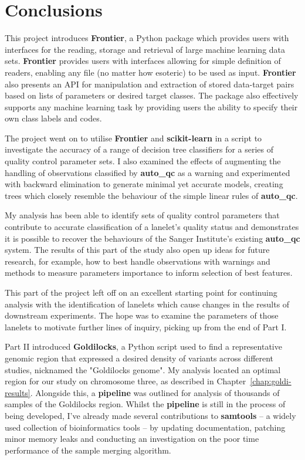 \chapter{Conclusions}

This project introduces \textbf{Frontier}, a Python package which provides users
with interfaces for the reading, storage and retrieval of large machine learning
data sets.  \textbf{Frontier} provides users with interfaces allowing for simple
definition of readers, enabling any file (no matter how esoteric) to be used as
input. \textbf{Frontier} also presents an API for manipulation and extraction of
stored data-target pairs based on lists of parameters or desired target classes.
The package also effectively supports any machine learning task by providing users
the ability to specify their own class labels and codes.

The project went on to utilise \textbf{Frontier} and \textbf{scikit-learn} in a
script to investigate the accuracy of a range of decision tree classifiers for a
series of quality control parameter sets. I also examined the effects of
augmenting the handling of observations classified by \textbf{auto\_qc} as a
warning and experimented with backward elimination to generate minimal yet
accurate models, creating trees which closely resemble the behaviour of the
simple linear rules of \textbf{auto\_qc}.

My analysis has been able to identify sets of quality control parameters that
contribute to accurate classification of a lanelet's quality status and
demonstrates it is possible to recover the behaviours of the Sanger Institute's
existing \textbf{auto\_qc} system. The results of this part of the study also
open up ideas for future
research, for example, how to best handle observations with warnings and methods
to measure parameters importance to inform selection of best features.

This part of the project left off on an excellent starting point for continuing
analysis with the identification of lanelets which cause changes in the results
of downstream experiments. The hope was to examine the parameters of those
lanelets to motivate further lines of inquiry, picking up from the end of Part
I.

Part II introduced \textbf{Goldilocks}, a Python script used to find a
representative genomic region that expressed a desired density of variants
across different studies, nicknamed the "Goldilocks genome". My analysis located
an optimal region for our study on chromosome three, as described in
Chapter~\ref{chap:goldi-results}. Alongside this, a \textbf{pipeline} was
outlined for analysis of thousands of samples of the Goldilocks region.  Whilst
the \textbf{pipeline} is still in the process of being developed, I've already
made several contributions to \textbf{samtools} -- a widely used
collection of bioinformatics tools -- by updating documentation,
patching minor memory leaks and conducting an investigation on the poor time
performance of the sample merging algorithm.

